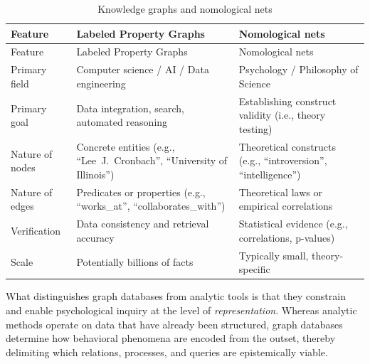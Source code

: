 \documentclass[sn-apa,pdflatex]{sn-jnl}
\theoremstyle{remark}
\theoremstyle{definition}
\begin{document}
\begin{longtable}[]{@{}
  >{\raggedright\arraybackslash}p{}
  >{\raggedright\arraybackslash}p{}
  >{\raggedright\arraybackslash}p{}@{}}
\caption{Knowledge graphs and nomological nets}\tabularnewline
\toprule\noalign{}
\begin{minipage}[b]{\linewidth}\raggedright
Feature
\end{minipage} & \begin{minipage}[b]{\linewidth}\raggedright
Labeled Property Graphs
\end{minipage} & \begin{minipage}[b]{\linewidth}\raggedright
Nomological nets
\end{minipage} \\
\midrule\noalign{}
\endfirsthead
\toprule\noalign{}
\begin{minipage}[b]{\linewidth}\raggedright
Feature
\end{minipage} & \begin{minipage}[b]{\linewidth}\raggedright
Labeled Property Graphs
\end{minipage} & \begin{minipage}[b]{\linewidth}\raggedright
Nomological nets
\end{minipage} \\
\midrule\noalign{}
\endhead
\bottomrule\noalign{}
\endlastfoot
Primary field & Computer science / AI / Data engineering & Psychology /
Philosophy of Science \\
Primary goal & Data integration, search, automated reasoning &
Establishing construct validity (i.e., theory testing) \\
Nature of nodes & Concrete entities (e.g., ``Lee~J.~Cronbach'',
``University of Illinois'') & Theoretical constructs (e.g.,
``introversion'', ``intelligence'') \\
Nature of edges & Predicates or properties (e.g., ``works\_at'',
``collaborates\_with'') & Theoretical laws or empirical correlations \\
Verification & Data consistency and retrieval accuracy & Statistical
evidence (e.g., correlations, p-values) \\
Scale & Potentially billions of facts & Typically small,
theory-specific \\
\end{longtable}

What distinguishes graph databases from analytic tools is that they
constrain and enable psychological inquiry at the level of
\emph{representation}. Whereas analytic methods operate on data that
have already been structured, graph databases determine how behavioral
phenomena are encoded from the outset, thereby delimiting which
relations, processes, and queries are epistemically viable.
\end{document}
